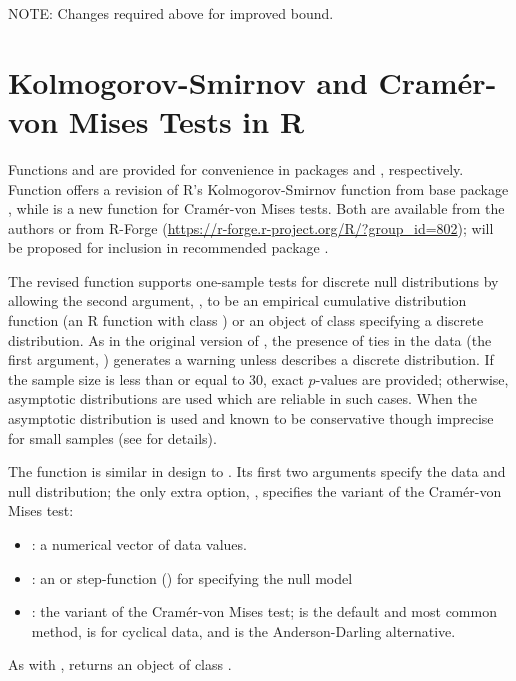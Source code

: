 NOTE: Changes required above for improved bound.

\section{Kolmogorov-Smirnov and Cram\'{e}r-von Mises Tests in R}

Functions  and  are provided for
convenience in packages  and , respectively.
Function  offers a revision of
R's Kolmogorov-Smirnov function  from base
package , while  is a new
function for Cram\'{e}r-von Mises tests.
Both are available from the authors
or from R-Forge (\url{https://r-forge.r-project.org/R/?group_id=802});
 will be proposed for inclusion in recommended
package .

The revised  function supports one-sample tests for discrete
null distributions by allowing the second argument, , to be
an empirical cumulative distribution function (an R function
with class ) or an object of class  specifying
a discrete distribution.  As in the original version of ,
the presence of ties in the data (the first argument, ) generates a
warning unless  describes a discrete distribution.  
If the sample size is less than or equal to 30, exact $p$-values are provided;
otherwise, asymptotic distributions
are used which are reliable in such cases.
When  the asymptotic distribution is used and known
to be conservative though imprecise for small samples (see \cite{Conover1972}
for details).

The function  is similar in design
to .  Its first two
arguments specify the data and null distribution; the only extra option,
, specifies the variant of the Cram\'{e}r-von Mises test:
\begin{itemize}
\item {}: a numerical vector of data values.
\item {}: an  or step-function () for specifying
the null model
\item {}: the variant of the Cram\'{e}r-von Mises test; 
is the default and most common method,  is for cyclical data,
and  is the Anderson-Darling alternative.
\end{itemize}
As with ,  returns an object of class 
.

